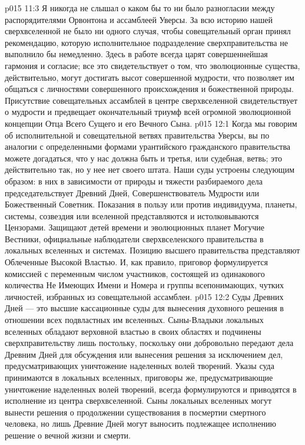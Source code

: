 \vs p015 11:3 Я никогда не слышал о каком бы то ни было разногласии между распорядителями Орвонтона и ассамблеей Уверсы. За всю историю нашей сверхвселенной не было ни одного случая, чтобы совещательный орган принял рекомендацию, которую исполнительное подразделение сверхправительства не выполнило бы немедленно. Здесь в работе всегда царят совершеннейшая гармония и согласие; все это свидетельствует о том, что эволюционные существа, действительно, могут достигать высот совершенной мудрости, что позволяет им общаться с личностями совершенного происхождения и божественной природы. Присутствие совещательных ассамблей в центре сверхвселенной свидетельствует о мудрости и предвещает окончательный триумф всей огромной эволюционной концепции Отца Всего Сущего и его Вечного Сына.
\vs p015 12:1 Когда мы говорим об исполнительной и совещательной ветвях правительства Уверсы, вы по аналогии с определенными формами урантийского гражданского правительства можете догадаться, что у нас должна быть и третья, или судебная, ветвь; это действительно так, но у нее нет своего штата. Наши суды устроены следующим образом: в них в зависимости от природы и тяжести разбираемого дела председательствует Древний Дней, Совершенствователь Мудрости или Божественный Советник. Показания в пользу или против индивидуума, планеты, системы, созвездия или вселенной представляются и истолковываются Цензорами. Защищают детей времени и эволюционных планет Могучие Вестники, официальные наблюдатели сверхвселенского правительства в локальных вселенных и системах. Позицию высшего правительства представляют Облеченные Высокой Властью. И, как правило, приговор формулируется комиссией с переменным числом участников, состоящей из одинакового количества Не Имеющих Имени и Номера и группы всепонимающих, чутких личностей, избранных из совещательной ассамблеи.
\vs p015 12:2 Суды Древних Дней --- это высшие кассационные суды для вынесения духовного решения в отношении всех подвластных им вселенных. Сыны\hyp{}Владыки локальных вселенных обладают верховной властью в своих областях и подчинены сверхправительству лишь постольку, поскольку они добровольно передают дела Древним Дней для обсуждения или вынесения решения за исключением дел, предусматривающих уничтожение наделенных волей творений. Указы суда принимаются в локальных вселенных, приговоры же, предусматривающие уничтожение наделенных волей творений, всегда формулируются и приводятся в исполнение из центра сверхвселенной. Сыны локальных вселенных могут вынести решения о продолжении существования в посмертии смертного человека, но лишь Древние Дней могут выносить подлежащее исполнению решение о вечной жизни и смерти.
